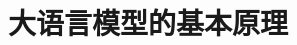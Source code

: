 \setcounter{chapter}{15}

\hypertarget{ux5927ux8bedux8a00ux6a21ux578bux7684ux57faux672cux539fux7406}{%
\chapter{大语言模型的基本原理}\label{ux5927ux8bedux8a00ux6a21ux578bux7684ux57faux672cux539fux7406}}
